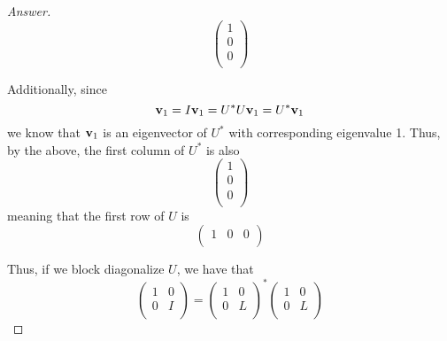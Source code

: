 \documentclass[../psets.tex]{subfiles}
\begin{document}
\begin{enumerate}[label={\textbf{6.\arabic*.}}]
\begin{enumerate}
\begin{proof}[Answer]
\begin{equation*}
                \begin{pmatrix}
                    1\\
                    0\\
                    0\\
                \end{pmatrix}
            \end{equation*}\par
            Additionally, since
            \begin{equation*}
                \mathbf{v}_1 = I\mathbf{v}_1 = U^*U\mathbf{v}_1 = U^*\mathbf{v}_1
            \end{equation*}
            we know that $\mathbf{v}_1$ is an eigenvector of $U^*$ with corresponding eigenvalue 1. Thus, by the above, the first column of $U^*$ is also
            \begin{equation*}
                \begin{pmatrix}
                    1\\
                    0\\
                    0\\
                \end{pmatrix}
            \end{equation*}
            meaning that the first row of $U$ is
            \begin{equation*}
                \begin{pmatrix}
                    1 & 0 & 0\\
                \end{pmatrix}
            \end{equation*}\par
            Thus, if we block diagonalize $U$, we have that
            \begin{equation*}
                \begin{pmatrix}
                    1 & 0\\
                    0 & I\\
                \end{pmatrix}
                =
                \begin{pmatrix}
                    1 & 0\\
                    0 & L\\
                \end{pmatrix}^*
                \begin{pmatrix}
                    1 & 0\\
                    0 & L\\

\end{pmatrix}
\end{equation*}
\end{proof}
\end{enumerate}
\end{enumerate}
\end{document}
